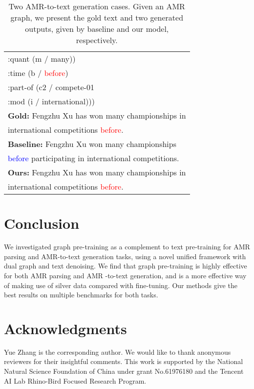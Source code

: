 \documentclass[11pt]{article}
\begin{document}
\begin{table}[!t]
\begin{tabular}{l}
        \quad\quad\quad :quant (m / many)) \\
        \quad\quad :time (b / \textcolor{red}{before}) \\
        \quad\quad :part-of (c2 / compete-01 \\
        \quad\quad\quad :mod (i / international))) \\
        \midrule
        \textbf{Gold:} Fengzhu Xu has won many championships in \\ \quad\quad international competitions \textcolor{red}{before}. \\
        \midrule
        \textbf{Baseline:} Fengzhu Xu won many championships \\ \quad\quad  \textcolor{blue}{before} participating in international competitions. \\
        \midrule
        \textbf{Ours:} Fengzhu Xu has won many championships in \\ \quad\quad international competitions \textcolor{red}{before}. \\
    \bottomrule
    \end{tabular}
    \caption{Two AMR-to-text generation cases. Given an AMR graph, we present the gold text and two generated outputs, given by baseline and our model, respectively.}
    \label{tab:case-generation-single}
\end{table}

\section{Conclusion}
We investigated graph pre-training as a complement to text pre-training for AMR parsing and AMR-to-text generation tasks, using a novel unified framework with dual graph and text denoising.
We find that graph pre-training is highly effective for both AMR parsing and AMR -to-text generation, and is a more effective way of making use of silver data compared with fine-tuning. 
Our methods give the best results on multiple benchmarks for both tasks.


\section*{Acknowledgments}
Yue Zhang is the corresponding author. 
We would like to thank anonymous reviewers for their insightful comments.
This work is supported by the National Natural Science Foundation of China under grant No.61976180 and the Tencent AI Lab Rhino-Bird Focused Research Program.
\end{document}
